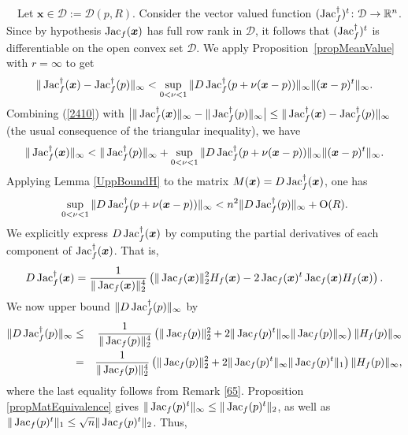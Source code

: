 \documentclass[10pt]{article}
\newcommand\sD{{\cal D}}
\newcommand{\x}{{\bm x}}
\newcommand\proof{\noindent{\em Proof.}\ \ } \newcommand\mult{\mbox{\rm mult}}
\newcommand\R{{\mathbb R}}
\def\Jac{\mathop{\rm Jac}\nolimits}
\begin{document}
\proof Let $\x \in \mathcal D:= \mathcal D(p,R)$. Consider the vector valued function {$(\Jac_f^\dagger)^t \colon \sD \rightarrow \R^n$.
Since by hypothesis $\Jac_f(\x)$ has full row rank in $\mathcal D$,
it follows that  $(\Jac_f^\dagger)^t$ is differentiable on the open convex set $\mathcal D$.
We apply Proposition~\ref{propMeanValue} with $r =\infty$ to get 
\begin{equation}\label{2410}
\|\Jac_f^\dagger(\x) - \Jac_f^\dagger(p)\|_\infty < 
\sup_{0<\nu<1} \|D \Jac_f ^\dagger(p+\nu(\x-p))\|_\infty \|(\x-p)^t\|_\infty.
\end{equation}
Combining (\ref{2410})  with
$\big| \|\Jac_f^\dagger(\x)\|_\infty - \|\Jac_f^\dagger(p)\|_\infty \big| \le \|\Jac_f^\dagger(\x) - \Jac_f^\dagger(p)\|_\infty$
(the usual consequence of the triangular inequality),
 we have
\begin{eqnarray}\label{princDisugJac}
\|\Jac_f^\dagger(\x)\|_\infty < \|\Jac_f^\dagger(p)\|_\infty + 
\sup_{0<\nu<1} \|D \Jac_f^\dagger (p+\nu(\x-p))\|_\infty \|(\x-p)^t\|_\infty.
\end{eqnarray}
Applying Lemma \ref{UppBoundH} to the matrix $M(\x)= D \Jac_f^\dagger (\x)$, one has
\begin{eqnarray}\label{supDJac}
\sup_{0<\nu<1} \|D \Jac_f^\dagger (p+\nu(\x-p))\|_\infty < n^2 \|D\Jac_f^\dagger(p)\|_\infty + {\rm O}(R).
\end{eqnarray}
We explicitly express $D \Jac_f^\dagger(\x)$ by computing the partial derivatives 
of each component of $\Jac_f^\dagger(\x)$. That is, 
\begin{eqnarray*}
D \Jac_f^\dagger(\x) = \frac{1}{\|\Jac_f(\x)\|_2^4} \left( 
\|\Jac_f(\x)\|_2^2 H_f(\x) - 2 \Jac_f(\x)^t \Jac_f(\x) H_f(\x)\right).
\end{eqnarray*}
We now  upper bound  $\|D \Jac_f^\dagger(p)\|_\infty$ by
\label{noncapisco2}
\begin{eqnarray*}\label{noncapisco2} 
\|D \Jac_f^\dagger(p)\|_\infty 
&\le& \frac{1}{\|\Jac_f(p)\|_2^4} \left( 
\|\Jac_f(p)\|_2^2  + 2 \|\Jac_f(p)^t\|_\infty \|\Jac_f(p)\|_\infty  \right)\|H_f(p)\|_\infty  \nonumber \\
&=& \frac{1}{\|\Jac_f(p)\|_2^4} \left( 
\|\Jac_f(p)\|_2^2  + 2 \|\Jac_f(p)^t\|_\infty \|\Jac_f(p)^t\|_1  \right)\|H_f(p)\|_\infty, \nonumber 
\end{eqnarray*}
where the last equality follows from Remark \ref{65}.
Proposition \ref{propMatEquivalence} 
 gives  $\|\Jac_f(p)^t\|_\infty \leq \|\Jac_f(p)^t\|_2$, as well as $\|\Jac_f(p)^t\|_1 \leq \sqrt{n} \|\Jac_f(p)^t\|_2$. Thus,
}
\end{document}
